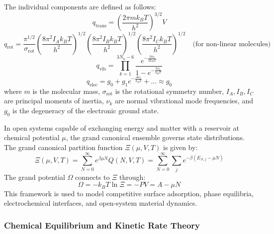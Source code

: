 \documentclass[12pt]{article}
\begin{document}
The individual components are defined as follows:
\begin{equation}
q_{\text{trans}} = \left( \frac{2\pi m k_B T}{h^2} \right)^{3/2} V
\end{equation}
\begin{equation}
q_{\text{rot}} = \frac{\pi^{1/2}}{\sigma_{\text{rot}}} \left( \frac{8\pi^2 I_A k_B T}{h^2} \right)^{1/2} \left( \frac{8\pi^2 I_B k_B T}{h^2} \right)^{1/2} \left( \frac{8\pi^2 I_C k_B T}{h^2} \right)^{1/2} \quad \text{(for non-linear molecules)}
\end{equation}
\begin{equation}
q_{\text{vib}} = \prod_{k=1}^{3N_n - 6} \frac{e^{-\frac{h \nu_k}{2 k_B T}}}{1 - e^{-\frac{h \nu_k}{k_B T}}}
\end{equation}
\begin{equation}
q_{\text{elec}} = g_0 + g_1 e^{-\frac{\Delta \varepsilon_1}{k_B T}} + \dots \approx g_0
\end{equation}
where $m$ is the molecular mass, $\sigma_{\text{rot}}$ is the rotational symmetry number, $I_A, I_B, I_C$ are principal moments of inertia, $\nu_k$ are normal vibrational mode frequencies, and $g_0$ is the degeneracy of the electronic ground state.

In open systems capable of exchanging energy and matter with a reservoir at chemical potential $\mu$, the grand canonical ensemble governs state distributions. The grand canonical partition function $\Xi(\mu, V, T)$ is given by:
\begin{equation}
\Xi(\mu, V, T) = \sum_{N=0}^{\infty} e^{\beta \mu N} Q(N, V, T) = \sum_{N=0}^{\infty} \sum_{j} e^{-\beta(E_{N,j} - \mu N)}
\end{equation}
The grand potential $\Omega$ connects to $\Xi$ through:
\begin{equation}
\Omega = -k_B T \ln \Xi = -P V = A - \mu N
\end{equation}
This framework is used to model competitive surface adsorption, phase equilibria, electrochemical interfaces, and open-system material dynamics.

\subsubsection{Chemical Equilibrium and Kinetic Rate Theory}
\end{document}
